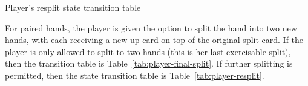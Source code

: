 \begin{table}[ht!]
\caption{Player's resplit state transition table}
\begin{center}

\end{center}
\label{tab:player-resplit}
\end{table}

For paired hands, the player is given the option to split the
hand into two new hands, with each receiving a new up-card on top
of the original split card.
If the player is only allowed to split to two hands
(this is her last exercisable split), 
then the transition table is Table~\ref{tab:player-final-split}.
If further splitting is permitted, then the state transition table
is Table~\ref{tab:player-resplit}.

